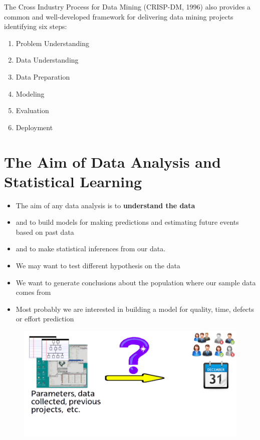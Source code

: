\documentclass[]{book}
\providecommand{\tightlist}{%
  \setlength{\itemsep}{0pt}\setlength{\parskip}{0pt}}
\begin{document}
The Cross Industry Process for Data Mining (CRISP-DM, 1996) also
provides a common and well-developed framework for delivering data
mining projects identifying six steps:

\begin{enumerate}
\def\labelenumi{\arabic{enumi}.}
\tightlist
\item
  Problem Understanding
\item
  Data Understanding
\item
  Data Preparation
\item
  Modeling
\item
  Evaluation
\item
  Deployment
\end{enumerate}

\section{The Aim of Data Analysis and Statistical
Learning}\label{the-aim-of-data-analysis-and-statistical-learning}

\begin{itemize}
\tightlist
\item
  The aim of any data analysis is to \textbf{understand the data}
\item
  and to build models for making predictions and estimating future
  events based on past data
\item
  and to make statistical inferences from our data.
\item
  We may want to test different hypothesis on the data
\item
  We want to generate conclusions about the population where our sample
  data comes from
\item
  Most probably we are interested in building a model for quality, time,
  defects or effort prediction
\end{itemize}

\begin{figure}[htbp]
\centering
\includegraphics{figures/prediction.png}
\caption{}
\end{figure}
\end{document}
